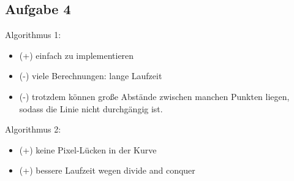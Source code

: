 \documentclass[11pt,twoside,a4paper]{article}
\begin{document}
\subsection{Aufgabe 4}

Algorithmus 1:

\begin{itemize} 
\item (+) einfach zu implementieren 
\item (-) viele Berechnungen: lange Laufzeit 
\item (-) trotzdem können große Abstände zwischen manchen Punkten liegen, sodass die Linie nicht durchgängig ist.
\end{itemize}


Algorithmus 2: 

\begin{itemize} 
\item (+) keine Pixel-Lücken in der Kurve
\item (+) bessere Laufzeit wegen divide and conquer
\end{itemize}
\end{document}
